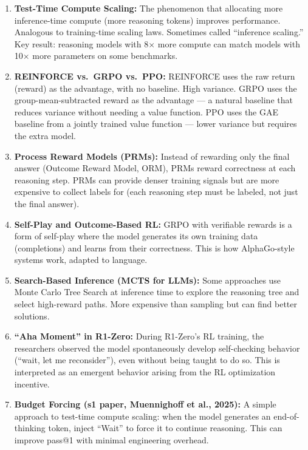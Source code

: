 \documentclass[11pt, a4paper]{article}
\begin{document}
\begin{enumerate}[leftmargin=2em]
  \item \textbf{Test-Time Compute Scaling:} The phenomenon that allocating more inference-time compute (more reasoning tokens) improves performance. Analogous to training-time scaling laws. Sometimes called ``inference scaling.'' Key result: reasoning models with 8$\times$ more compute can match models with 10$\times$ more parameters on some benchmarks.

  \item \textbf{REINFORCE vs.\ GRPO vs.\ PPO:} REINFORCE uses the raw return (reward) as the advantage, with no baseline. High variance. GRPO uses the group-mean-subtracted reward as the advantage --- a natural baseline that reduces variance without needing a value function. PPO uses the GAE baseline from a jointly trained value function --- lower variance but requires the extra model.

  \item \textbf{Process Reward Models (PRMs):} Instead of rewarding only the final answer (Outcome Reward Model, ORM), PRMs reward correctness at each reasoning step. PRMs can provide denser training signals but are more expensive to collect labels for (each reasoning step must be labeled, not just the final answer).

  \item \textbf{Self-Play and Outcome-Based RL:} GRPO with verifiable rewards is a form of self-play where the model generates its own training data (completions) and learns from their correctness. This is how AlphaGo-style systems work, adapted to language.

  \item \textbf{Search-Based Inference (MCTS for LLMs):} Some approaches use Monte Carlo Tree Search at inference time to explore the reasoning tree and select high-reward paths. More expensive than sampling but can find better solutions.

  \item \textbf{``Aha Moment'' in R1-Zero:} During R1-Zero's RL training, the researchers observed the model spontaneously develop self-checking behavior (``wait, let me reconsider''), even without being taught to do so. This is interpreted as an emergent behavior arising from the RL optimization incentive.

  \item \textbf{Budget Forcing (s1 paper, Muennighoff et al., 2025):} A simple approach to test-time compute scaling: when the model generates an end-of-thinking token, inject ``Wait'' to force it to continue reasoning. This can improve pass@1 with minimal engineering overhead.


\end{enumerate}
\end{document}
